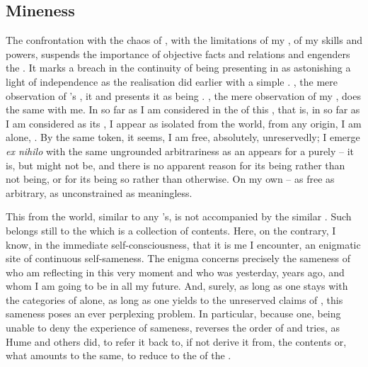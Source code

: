 
\subsection{Mineness}\label{sec:levelC}
\pa\label{refl:C}
The confrontation with the chaos of , with the limitations of my
, of my skills and powers, suspends the importance of objective facts
and relations and engenders the .  It marks a breach in the continuity of being presenting 
in as astonishing a light of  independence as the realisation
 did earlier with a simple .  , the
mere observation  of 's ,
 it and presents it as being .  , the mere observation  of my , does the
same with me.  In so far as I am considered in the  of this
, that is, in so far as I am considered as its , I appear as
isolated from the world, from any origin, I am alone, . By the
same token, it seems, I am free, absolutely, unreservedly; I emerge {\em ex
  nihilo} with the same ungrounded arbitrariness as an  appears for a
purely  -- it is, but might not be, and there is no apparent
reason for its being rather than not being, or for its being so rather than
otherwise. On my own  -- as free
as arbitrary, as unconstrained as meaningless. 

This  from the world, similar to any 's, is
not accompanied by the similar .  Such  belongs
still to the  which is a collection of  contents. Here,
on the contrary, I know, in the immediate self-consciousness, that it is me
 I encounter, an enigmatic site of continuous self-sameness.  The
enigma concerns precisely the sameness of  who am reflecting in this
very moment and  who was yesterday, years ago, and whom I am going to
be in all my future. And, surely, as long as one stays with the categories of
 alone, as long as one yields to the unreserved claims of
, this sameness poses an ever perplexing problem. In
particular, because one, being unable to deny the experience of sameness,
reverses the order of  and tries, as Hume and others did, to refer it
back to, if not derive it from, the  contents or, what amounts to
the same, to reduce  to the  of the .

